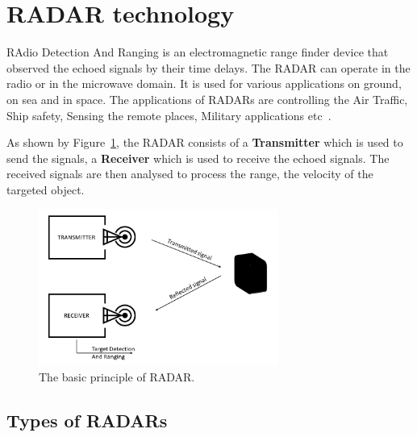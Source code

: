 \section{RADAR technology}
RAdio Detection And Ranging is an electromagnetic range finder device that observed the echoed signals by their time delays.  The RADAR can operate in the radio or in the microwave domain. 
It is used for various applications on ground, on sea and in space. The applications of RADARs are controlling the Air Traffic, Ship safety, Sensing the remote places, Military applications etc~\cite{RADAR}.

As shown by Figure~\ref{fig:basic_principle}, the RADAR consists of a \textbf{Transmitter} which is used to send the signals, a \textbf{Receiver} which is used to receive the echoed signals.
The received signals are then analysed to process the range, the velocity of the targeted object. 

\begin{figure}[ht]
  \begin{center}
    \includegraphics[width=0.70\textwidth]{Master's thesis/images/basic_block1.png} 
    \caption{The basic principle of RADAR.}
    \label{fig:basic_principle}
  \end{center}
\end{figure}

\subsection{Types of RADARs}

